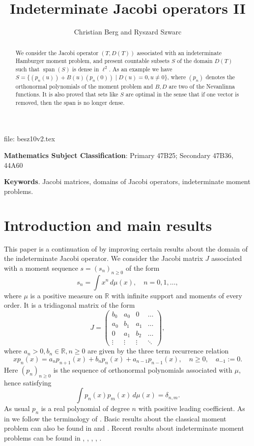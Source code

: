 \documentclass [12pt]{article}
\title{Indeterminate Jacobi operators II}
\author{Christian Berg and Ryszard Szwarc}
\DeclareMathOperator{\spn}{span}
\newcommand{\R}{\mathbb{R}}
\begin{document}
 \maketitle
file: besz10v2.tex

\begin{abstract}  We consider the Jacobi operator $(T,D(T))$ associated with an indeterminate Hamburger moment problem, and present countable subsets $S$ of the domain $D(T)$  such that $\spn(S)$ is dense in $\ell^2$. As an example  we have $S=\{(p_n(u))+B(u)(p_n(0)) \mid D(u)=0, u\neq 0\}$, where $(p_n)$ denotes the orthonormal polynomials of the moment problem and $B, D$ are two of the Nevanlinna functions. 
It is also proved that sets like $S$ are optimal in the sense that if one vector is removed, then the span is no longer dense.
\end{abstract}

{\bf Mathematics Subject Classification}: Primary 47B25; Secondary 47B36, 44A60

{\bf Keywords}. Jacobi matrices, domains of Jacobi operators, indeterminate moment problems.


\section{Introduction and main results} This paper is a continuation of \cite{B:S5}  by improving certain results about the domain of the indeterminate Jacobi operator. We  consider the Jacobi matrix $J$ associated with a moment sequence $s=(s_n)_{n\ge 0}$ of the form
\begin{equation}\label{eq:mom}
s_n=\int x^n\,d\mu(x),\quad n=0,1,\ldots,
\end{equation}
where $\mu$ is a positive measure on $\R$  with infinite support and moments of every order. It is a tridiagonal matrix of the  form
\begin{equation}\label{eq:Jac}
J=\begin{pmatrix}
b_0 & a_0 & 0 & \hdots\\
a_0 & b_1 & a_1 & \hdots\\
0 & a_1 & b_2 & \hdots\\
\vdots &\vdots & \vdots & \ddots
\end{pmatrix},
\end{equation}
where $a_n>0, b_n\in\R, n\ge 0$  are given by the three term recurrence relation
\begin{equation*}\label{eq:3term}
xp_n(x)=a_np_{n+1}(x)+b_np_n(x)+a_{n-1}p_{n-1}(x),\quad n\ge 0, \quad a_{-1}:=0.
\end{equation*}
Here $(p_n)_{n\ge 0}$ is the sequence of orthonormal polynomials associated with $\mu$, hence satisfying
\begin{equation*}\label{eq:op}
\int p_n(x)p_m(x)\,d\mu(x)=\delta_{n,m}.
\end{equation*}
As usual $p_n$ is a real polynomial of degree $n$ with positive leading coefficient. As in \cite{B:S5} we follow the terminology of \cite{Sch}. Basic results about the classical moment problem can also be found in \cite{Ak} and \cite{S}. Recent  results about indeterminate moment problems can be found in \cite{B:S1}, \cite{B:S2}, \cite{B:S3}, \cite{B:S4}, \cite{B:S5}.
\end{document}
